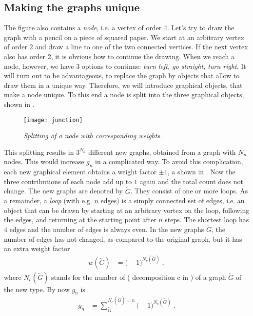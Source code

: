 \subsection{Making the graphs unique}
The figure also contains a {\em node}, 
i.e. a vertex of order 4. Let's  try to draw the graph with a pencil on a piece of 
squared paper. We start at an arbitrary  vertex of order 2 and draw a line to one of the two connected vertices. If the next vertex also has order 2, it is obvious how to continue the drawing. When we reach a node, however, we have 3 options to continue:
{\it turn left, go straight, turn right}. 
It will turn out to be advantageous, to replace the graph by objects that allow to draw them in a unique way. Therefore, we will introduce graphical objects, that make a node unique. To this end a node is split into the three graphical objects, shown in
.
%
\begin{figure}[h]
\texttt{[image: junction]}
\caption{{\it Splitting of a node with corresponding weights.}\label{fig:ising:junction}}
\end{figure}
%
This splitting  results in $3^{N_{n}}$
different new graphs, obtained from a graph with $N_{n}$ nodes. This would increase $g_{n}$ in a complicated way. To avoid this complication,
each new graphical element obtains a weight factor $\pm 1$, a shown in . Now the three contributions of each node add up to $1$ again and the total count does not change.
The new graphs are denoted by $\tilde G$. They consist of one or more loops. 
As a remainder, a  {\em loop} (with e.g. $n$ edges) is a simply connected set  of edges, i.e. an object that can be drawn by starting at an arbitrary vortex on the loop, following the edges, and returning at the starting point after $n$ steps. The shortest loop has $4$ edges and the number of edges is always even.
In the new graphs $\tilde G$, the number of edges has not changed,   as compared to the  original graph,  but it has an extra weight factor
%
\begin{align*}
w(\tilde G) &= \big( -1 \big)^{N_{c}(\tilde G)}\;,
\end{align*}
%
where $N_{c}(\tilde G)$ stands for the number of  ( decomposition c in ) of a graph $\tilde G$ of the new type.
By now $g_{n}$ is 
%
\begin{align*}
g_{n} &= \sum_{\tilde G}^{N_{e}(\tilde G)=n} \big( -1 \big)^{N_{c}(\tilde G)}\;.
\end{align*}
%

